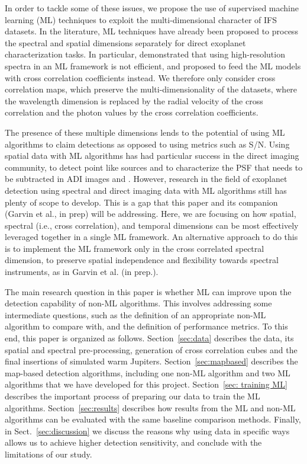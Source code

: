 \documentclass{aa}
\begin{document}
In order to tackle some of these issues, we propose the use of supervised machine learning (ML) techniques to exploit the multi-dimensional character of IFS datasets. In the literature, ML techniques have already been proposed to process the spectral and spatial dimensions separately for direct exoplanet characterization tasks. In particular, \citet{2020Fisher} demonstrated that using high-resolution spectra in an ML framework is not efficient, and proposed to feed the ML models with cross correlation coefficients instead. 
We therefore only consider cross correlation maps, which preserve the multi-dimensionality of the datasets, where the wavelength dimension is replaced by the radial velocity of the cross correlation and the photon values by the cross correlation coefficients. 

The presence of these multiple dimensions lends to the potential of using ML algorithms to claim detections as opposed to using metrics such as S/N.
Using spatial data with ML algorithms has had particular success in the direct imaging community, to detect point like sources \cite{2018Gomez} and \cite{2023Carlito} to characterize the PSF that needs to be subtracted in ADI images \cite{2022Gebhard} and \cite{2023Flasseur}.
However, research in the field of exoplanet detection using spectral and direct imaging data with ML algorithms still has plenty of scope to develop. This is a gap that this paper and its companion (Garvin et al., in prep) will be addressing.
Here, we are focusing on how spatial, spectral (i.e., cross correlation), and temporal dimensions can be most effectively leveraged together in a single ML framework. 
An alternative approach to do this is to implement the ML framework only in the cross correlated spectral dimension, to preserve spatial independence and flexibility towards spectral instruments, as in Garvin et al. (in prep.).

The main research question in this paper is whether ML can improve upon the detection capability of non-ML algorithms. This involves addressing some intermediate questions, such as the definition of an appropriate non-ML algorithm to compare with, and the definition of performance metrics.
To this end, this paper is organized as follows. Section~\ref{sec:data} describes the data, its spatial and spectral pre-processing, generation of cross correlation cubes and the final insertions of simulated warm Jupiters.
Section~\ref{sec:mapbased} describes the map-based detection algorithms, including one non-ML algorithm and two ML algorithms that we have developed for this project.
Section~\ref{sec: training ML} describes the important process of preparing our data to train the ML algorithms.
Section~\ref{sec:results} describes how results from the ML and non-ML algorithms can be evaluated with the same baseline comparison methods.
Finally, in Sect.~\ref{sec:discussion} we discuss the reasons why using data in specific ways allows us to achieve higher detection sensitivity, and conclude with the limitations of our study.
\end{document}
